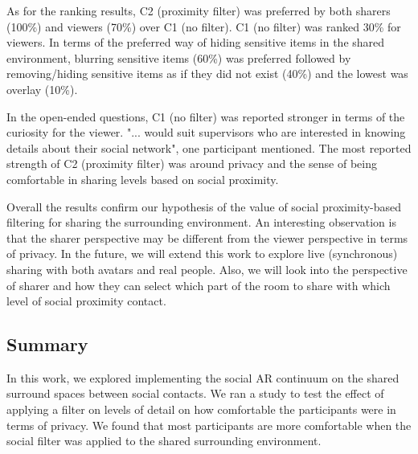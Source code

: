 As for the ranking results, C2 (proximity filter) was preferred by both sharers (100\%) and viewers (70\%) over C1 (no filter). C1 (no filter) was ranked 30\% for viewers. In terms of the preferred way of hiding sensitive items in the shared environment, blurring sensitive items (60\%) was preferred followed by removing/hiding sensitive items as if they did not exist (40\%) and the lowest was overlay (10\%). 

In the open-ended questions, C1 (no filter) was reported stronger in terms of the curiosity for the viewer. "... would suit supervisors who are interested in knowing details about their social network", one participant mentioned. The most reported strength of C2 (proximity filter) was around privacy and the sense of being comfortable in sharing levels based on social proximity. 

Overall the results confirm our hypothesis of the value of social proximity-based filtering for sharing the surrounding environment. An interesting observation is that the sharer perspective may be different from the viewer perspective in terms of privacy. In the future, we will extend this work to explore live (synchronous) sharing with both avatars and real people. Also, we will look into the perspective of sharer and how they can select which part of the room to share with which level of social proximity contact.

\subsection{Summary}

In this work, we explored implementing the social AR continuum on the shared surround spaces between social contacts. We ran a study to test the effect of applying a filter on levels of detail on how comfortable the participants were in terms of privacy. We found that most participants are more comfortable when the social filter was applied to the shared surrounding environment. 